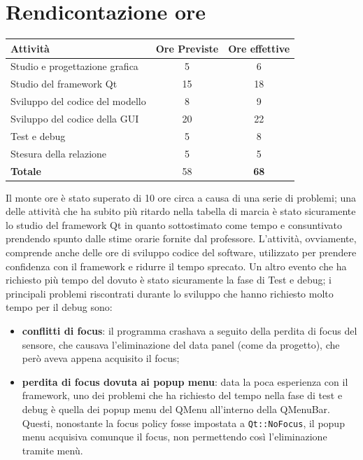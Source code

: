 \documentclass[a4paper, 12pt]{article}
\begin{document}
    \section{Rendicontazione ore}
    \begin{center}
        \begin{tabular}{|l|c|c|}
            \hline
            \textbf{Attività} & \textbf{Ore Previste} & \textbf{Ore effettive} \\
            \hline
            Studio e progettazione grafica & 5 & 6 \\
            \hline
            Studio del framework Qt & 15 & 18 \\
            \hline
            Sviluppo del codice del modello & 8 & 9 \\
            \hline
            Sviluppo del codice della GUI & 20 & 22 \\
            \hline
            Test e debug & 5 & 8 \\
            \hline
            Stesura della relazione & 5 & 5 \\
            \hline
            \textbf{Totale} & 58 & \textbf{68} \\
            \hline
        \end{tabular}
    \end{center}
    Il monte ore è stato superato di 10 ore circa a causa di una serie di problemi; una delle attività che ha subito più ritardo nella tabella di marcia è stato sicuramente lo studio del framework Qt in quanto sottostimato come tempo e consuntivato prendendo spunto dalle stime orarie fornite dal professore. L'attività, ovviamente, comprende anche delle ore di sviluppo codice del software, utilizzato per prendere confidenza con il framework e ridurre il tempo sprecato.
    Un altro evento che ha richiesto più tempo del dovuto è stato sicuramente la fase di Test e debug; i principali problemi riscontrati durante lo sviluppo che hanno richiesto molto tempo per il debug sono:
    \begin{itemize}
        \item \textbf{conflitti di focus}: il programma crashava a seguito della perdita di focus del sensore, che causava l'eliminazione del data panel (come da progetto), che però aveva appena acquisito il focus;
        \item \textbf{perdita di focus dovuta ai popup menu}: data la poca esperienza con il framework, uno dei problemi che ha richiesto del tempo nella fase di test e debug è quella dei popup menu del QMenu all'interno della QMenuBar. Questi, nonostante la focus policy fosse impostata a \texttt{Qt::NoFocus}, il popup menu acquisiva comunque il focus, non permettendo così l'eliminazione tramite menù.
    \end{itemize}
\end{document}
